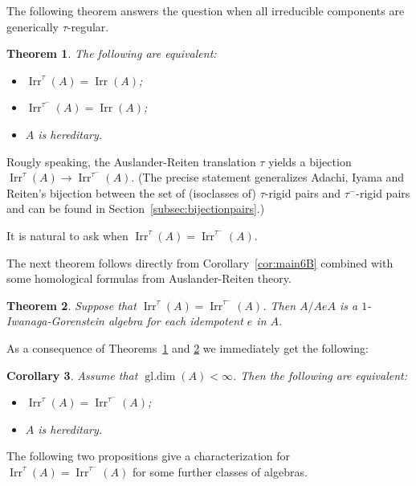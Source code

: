 \documentclass[12pt,reqno]{amsart}
\newtheorem{Thm}{Theorem}[section]
\newtheorem{Cor}[Thm]{Corollary}
\theoremstyle{definition}
\newcommand{\gldim}{\operatorname{gl.dim}}
\newcommand{\irr}{\operatorname{Irr}}
\begin{document}
The following theorem answers the question when all
irreducible components are generically $\tau$-regular.

\begin{Thm}\label{thm:main1}
The following are equivalent:
\begin{itemize}\itemsep2mm

\item[(i)]
$\irr^\tau(A) = \irr(A)$;

\item[(ii)]
$\irr^{\tau^-}(A) = \irr(A)$;

\item[(iii)]
$A$ is hereditary.

\end{itemize}
\end{Thm}

Rougly speaking, the Auslander-Reiten translation $\tau$ yields a
bijection
$\irr^\tau(A) \to \irr^{\tau^-}(A)$.
(The precise statement generalizes
Adachi, Iyama and Reiten's \cite{AIR14}
bijection between the set of (isoclasses of) $\tau$-rigid pairs and
$\tau^-$-rigid pairs and can be found in
Section~\ref{subsec:bijectionpairs}.)

It is natural to ask when $\irr^\tau(A) = \irr^{\tau^-}(A)$.

The next theorem follows directly from Corollary~\ref{cor:main6B}
combined with some
homological formulas from Auslander-Reiten theory.

\begin{Thm}\label{thm:main4}
Suppose that $\irr^\tau(A) = \irr^{\tau^-}(A)$.
Then $A/AeA$ is a $1$-Iwanaga-Gorenstein algebra for each
idempotent $e$ in $A$.
\end{Thm}

As a consequence of
Theorems~\ref{thm:main1} and \ref{thm:main4}
we immediately get the following:


\begin{Cor}\label{cor:main5}
Assume that $\gldim(A) < \infty$.
Then the following are equivalent:
\begin{itemize}\itemsep2mm

\item[(i)]
$\irr^\tau(A) = \irr^{\tau^-}(A)$;

\item[(ii)]
$A$ is hereditary.

\end{itemize}
\end{Cor}


The following two propositions give a characterization for
$\irr^\tau(A) = \irr^{\tau^-}(A)$ for
some further classes of algebras.
\end{document}
